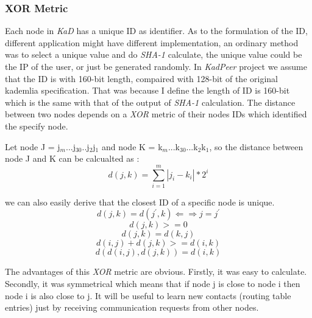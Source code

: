 \subsubsection{XOR Metric}
{
Each node in \emph{KaD} has a unique ID as identifier. 
As to the formulation of the ID, different application might have different implementation, an ordinary method was to select a unique value and do \emph{SHA-1} calculate, the unique value could be the IP of the user, or just be generated randomly.
In \emph{KadPeer} project we assume that the ID is with 160-bit length, compaired with 128-bit of the original kademlia specification.
That was because I define the length of ID is 160-bit which is the same with that of the output of \emph{SHA-1} calculation.
The distance between two nodes depends on a \emph{XOR} metric of their nodes IDs which identified the specify node.

Let node J = j$_{m}$...j$_{30}$..j$_{2}$j$_{1}$ and node K = k$_{m}$...k$_{30}$...k$_{2}$k$_{1}$, so the distance between node J and K can be calcualted as :
\begin{equation}
d(j,k) = \sum_{i=1}^{m}{
  \left\vert 
j_{i} -k_{i}
  \right\vert * 2^{i}
}
\end{equation}

we can also easily derive that the closest ID of a specific node is unique.
\begin{equation}
d(j,k) = d( j^{'},k) \Leftarrow\Rightarrow j = j^{'}
\end{equation}
\begin{equation}
d(j,k) >= 0
\end{equation}
\begin{equation}
d(j,k) = d(k,j)
\end{equation}
\begin{equation}
d(i,j) + d(j,k) >= d(i,k)
\end{equation}
\begin{equation}
d(d(i,j),d(j,k)) = d(i,k)
\end{equation}

The advantages of this \emph{XOR} metric are obvious. 
Firstly, it was easy to calculate.
Secondly, it was symmetrical which means that if node j is close to node i then node i is also close to j.
It will be useful to learn new contacts (routing table entries) just by receiving communication requests from other nodes.
}

